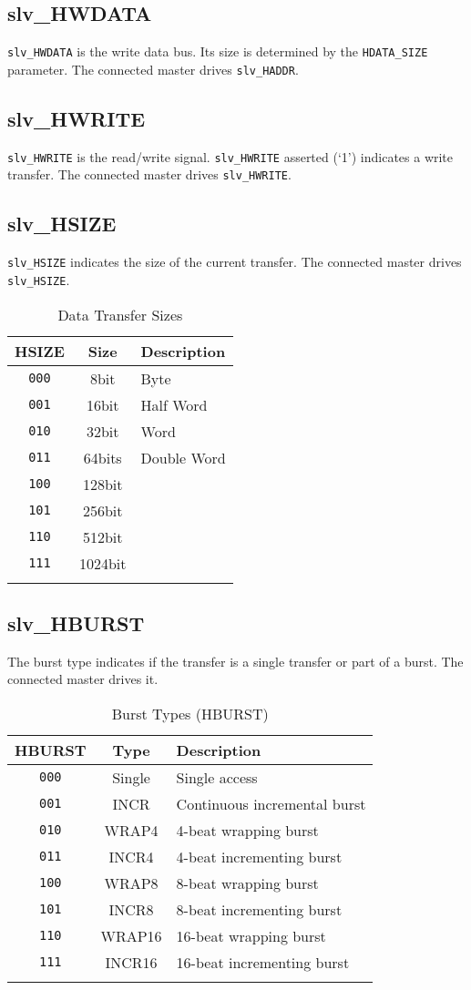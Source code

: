 \subsection{slv\_HWDATA}\label{slv_hwdata}

\texttt{slv\_HWDATA} is the write data bus. Its size is determined by the
\texttt{HDATA\_SIZE} parameter. The connected master drives \texttt{slv\_HADDR}.

\subsection{slv\_HWRITE}\label{slv_hwrite}

\texttt{slv\_HWRITE} is the read/write signal. \texttt{slv\_HWRITE} asserted (`1') indicates a
write transfer. The connected master drives \texttt{slv\_HWRITE}.

\subsection{slv\_HSIZE}\label{slv_hsize}

\texttt{slv\_HSIZE} indicates the size of the current transfer. The connected
master drives \texttt{slv\_HSIZE}.

\begin{longtable}[]{@{}ccl@{}}
\toprule
HSIZE & Size & Description\tabularnewline
\midrule
\endhead
\texttt{000} & 8bit    & Byte\tabularnewline
\texttt{001} & 16bit   & Half Word\tabularnewline
\texttt{010} & 32bit   & Word\tabularnewline
\texttt{011} & 64bits  & Double Word\tabularnewline
\texttt{100} & 128bit  & \tabularnewline
\texttt{101} & 256bit  & \tabularnewline
\texttt{110} & 512bit  & \tabularnewline
\texttt{111} & 1024bit & \tabularnewline
\bottomrule
\caption{Data Transfer Sizes}
\end{longtable}

\subsection{slv\_HBURST}\label{slv_hburst}

The burst type indicates if the transfer is a single transfer or part of
a burst. The connected master drives it.

\begin{longtable}[]{@{}ccl@{}}
\toprule
HBURST & Type & Description\tabularnewline
\midrule
\endhead
\texttt{000} & Single & Single access\tabularnewline
\texttt{001} & INCR   & Continuous incremental burst\tabularnewline
\texttt{010} & WRAP4  & 4-beat wrapping burst\tabularnewline
\texttt{011} & INCR4  & 4-beat incrementing burst\tabularnewline
\texttt{100} & WRAP8  & 8-beat wrapping burst\tabularnewline
\texttt{101} & INCR8  & 8-beat incrementing burst\tabularnewline
\texttt{110} & WRAP16 & 16-beat wrapping burst\tabularnewline
\texttt{111} & INCR16 & 16-beat incrementing burst\tabularnewline
\bottomrule
\caption{Burst Types (HBURST)}
\end{longtable}

